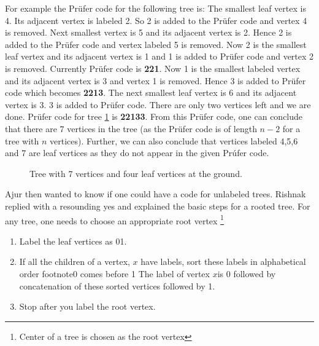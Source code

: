 For example the Pr{\"u}fer code for the following tree is: The smallest leaf vertex is 4. Its adjacent vertex is labeled 2. So 2 is added to the Pr{\"u}fer code and vertex 4 is removed. Next smallest vertex is 5 and its adjacent vertex is 2. Hence 2 is added to the Pr{\"u}fer code and vertex labeled 5 is removed. Now 2 is the smallest leaf vertex and its adjacent vertex is 1 and  1 is added to Pr{\"u}fer code and vertex 2 is removed. Currently Pr{\"u}fer code is \textbf{221}. Now 1 is the smallest labeled vertex and its adjacent vertex is 3 and vertex 1 is removed. Hence 3 is added to Pr{\"u}fer code which becomes \textbf{2213}. The next smallest leaf vertex is 6 and its adjacent vertex is 3. 3 is added to Pr{\"u}fer code. There are only two vertices left and we are done. Pr{\"u}fer code for tree \ref{8g5} is \textbf{22133}. From this Pr{\"u}fer code, one can conclude that there are 7 vertices in the tree (as the Pr{\"u}fer code is of length $n-2$ for a tree with $n$ vertices). Further, we can also conclude that vertices labeled 4,5,6 and 7 are leaf vertices as they do not appear in the given Pr{\'u}fer code. 
\begin{figure}
\begin{center}


\caption{Tree with 7 vertices and four leaf vertices at the ground. }\label{8g5}
\end{center}
\end{figure}

Ajur then wanted to know if one could have a code for unlabeled trees. Rishnak replied with a resounding yes and explained the basic steps for a rooted tree. For any tree, one needs to choose an appropriate root vertex \footnote{Center of a tree is chosen as the root vertex} 
\begin{enumerate}
    \item  Label the leaf vertices as 01.
    \item If all the children of a vertex, $x$ have labels, sort these labels in alphabetical order footnote{0 comes before 1} The label of vertex $x$is 0 followed by concatenation of these sorted vertices followed by 1.
    \item Stop after you label the root vertex.
\end{enumerate}

